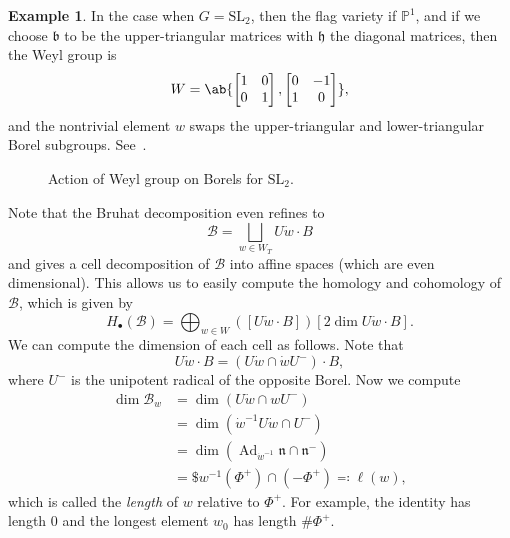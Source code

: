 \documentclass{amsart}
\theoremstyle{definition}
\newtheorem{exm}[thm]{Example}
\theoremstyle{remark}
\theoremstyle{plain}
\theoremstyle{definition}
\theoremstyle{remark}
\newcommand{\R}{\mathbb{R}}
\renewcommand{\P}{\mathbb{P}}
\newcommand{\h}{\mathfrak{h}}
\newcommand{\n}{\mathfrak{n}}
\renewcommand{\b}{\mathfrak{b}}
\newcommand{\mc}[1]{\mathcal{#1}}
\newcommand{\mr}[1]{\mathrm{#1}}
\newcommand{\1}{\mathbf{1}}
\newcommand{\2}{\mathbf{2}}
\newcommand{\3}{\mathbf{3}}
\newcommand{\SL}{\mr{SL}}
\DeclareMathOperator{\Ad}{Ad}
\begin{document}
\begin{exm}
    In the case when \(G = \SL_2\), then the flag variety if \(\P^1\), and if we choose \(\b\) to be the upper-triangular matrices with \(\h\) the diagonal matrices, then the Weyl group is
    \[ W = \ab\{ \begin{bmatrix}
        1 & 0 \\
        0 & 1
    \end{bmatrix}, \begin{bmatrix}
        0 & -1 \\
        1 & 0
    \end{bmatrix}\}, \]
    and the nontrivial element \(w\) swaps the upper-triangular and lower-triangular Borel subgroups. See~.
    \begin{figure}[htpb]
    \begin{center}
    \end{center}
    \caption{Action of Weyl group on Borels for \(\SL_2\).}%
    \label{fig:sl2-weyl-borels}
    \end{figure}  
\end{exm}

Note that the Bruhat decomposition even refines to
\[ \mc{B} = \bigsqcup_{w \in W_T} U \dot{w} \cdot B \]
and gives a cell decomposition of \(\mc{B}\) into affine spaces (which are even dimensional). This allows us to easily compute the homology and cohomology of \(\mc{B}\), which is given by
\[ H_{\bullet}(\mc{B}) = \bigoplus_{w \in W} ([U \dot{w} \cdot B]) [2 \dim U \dot{w} \cdot B]. \]
We can compute the dimension of each cell as follows. Note that
\[ U \dot{w} \cdot B = (U \dot{w} \cap \dot{w}U^-) \cdot B, \]
where \(U^-\) is the unipotent radical of the opposite Borel. Now we compute
\begin{align*}
    \dim \mc{B}_w &= \dim (U \dot{w} \cap w U^-) \\
    &= \dim (\dot{w}^{-1} U \dot{w} \cap U^-) \\
    &= \dim (\Ad_{\dot{w}^{-1}} \n \cap \n^-) \\
    &= \$ w^{-1} (\Phi^+) \cap (-\Phi^+) \eqqcolon \ell(w),
\end{align*}
which is called the \textit{length} of \(w\) relative to \(\Phi^+\). For example, the identity has length \(0\) and the longest element \(w_0\) has length \(\# \Phi^+\).
\end{document}
